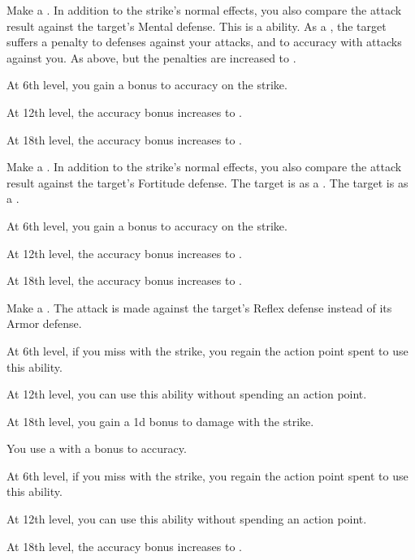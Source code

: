 {             Make a .
            In addition to the strike's normal effects, you also compare the attack result against the target's Mental defense.
            This is a  ability.
             As a , the target suffers a  penalty to defenses against your attacks, and to accuracy with attacks against you.
             As above, but the penalties are increased to .
            \par At 6th level, you gain a  bonus to accuracy on the strike.
            \par At 12th level, the accuracy bonus increases to .
            \par At 18th level, the accuracy bonus increases to .

             Make a .
            In addition to the strike's normal effects, you also compare the attack result against the target's Fortitude defense.
             The target is \sickened as a .
             The target is \nauseated as a .
            \par At 6th level, you gain a  bonus to accuracy on the strike.
            \par At 12th level, the accuracy bonus increases to .
            \par At 18th level, the accuracy bonus increases to .

             Make a .
            The attack is made against the target's Reflex defense instead of its Armor defense.
            \par At 6th level, if you miss with the strike, you regain the action point spent to use this ability.
            \par At 12th level, you can use this ability without spending an action point.
            \par At 18th level, you gain a \plus1d bonus to damage with the strike.

             You use a  with a  bonus to accuracy.
            \par At 6th level, if you miss with the strike, you regain the action point spent to use this ability.
            \par At 12th level, you can use this ability without spending an action point.
            \par At 18th level, the accuracy bonus increases to .

}
